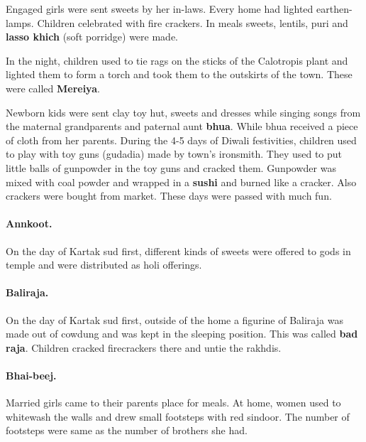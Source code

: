 Engaged girls were sent sweets by her in-laws. Every home had lighted
earthen-lamps. Children celebrated with fire crackers. In meals sweets,
lentils, puri and \textbf{lasso khich} (soft porridge) were made.

In the night, children used to tie rags on the sticks of the Calotropis plant
and lighted them to form a torch and took them to the outskirts of the town.
These were called \textbf{Mereiya}.

Newborn kids were sent clay toy hut, sweets and dresses while singing songs
from the maternal grandparents and paternal aunt \textbf{bhua}. While bhua
received a piece of cloth from her parents.  During the 4-5 days of Diwali
festivities, children used to play with toy guns (gudadia) made by town's
ironsmith. They used to put little balls of gunpowder in the toy guns and
cracked them. Gunpowder was mixed with coal powder and wrapped in a
\textbf{sushi} and burned like a cracker. Also crackers were bought from
market.  These days were passed with much fun.  \paragraph{Annkoot.} On the day
of Kartak sud first, different kinds of sweets were offered to gods in temple
and were distributed as holi offerings.  \paragraph{Baliraja.} On the day of
Kartak sud first, outside of the home a figurine of Baliraja was made out of
cowdung and was kept in the sleeping position. This was called \textbf{bad
raja}. Children cracked firecrackers there and untie the rakhdis.
\paragraph{Bhai-beej.} Married girls came to their parents place for meals. At
home, women used to whitewash the walls and drew small footsteps with red
sindoor. The number of footsteps were same as the number of brothers she had.
